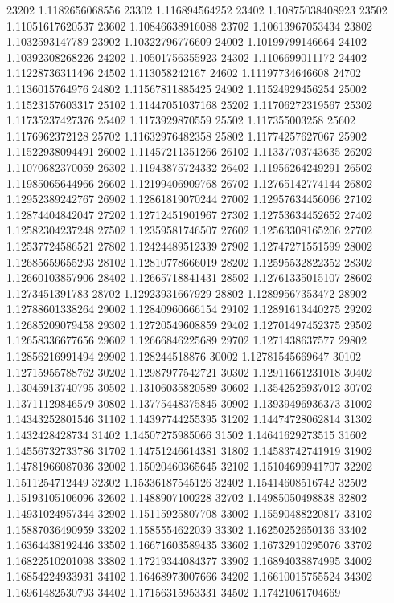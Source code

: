 {23202 1.1182656068556
23302 1.116894564252
23402 1.10875038408923
23502 1.11051617620537
23602 1.10846638916088
23702 1.10613967053434
23802 1.1032593147789
23902 1.10322796776609
24002 1.10199799146664
24102 1.10392308268226
24202 1.10501756355923
24302 1.1106699011172
24402 1.11228736311496
24502 1.113058242167
24602 1.11197734646608
24702 1.1136015764976
24802 1.11567811885425
24902 1.11524929456254
25002 1.11523157603317
25102 1.11447051037168
25202 1.11706272319567
25302 1.11735237427376
25402 1.1173929870559
25502 1.117355003258
25602 1.1176962372128
25702 1.11632976482358
25802 1.11774257627067
25902 1.11522938094491
26002 1.11457211351266
26102 1.11337703743635
26202 1.11070682370059
26302 1.11943875724332
26402 1.11956264249291
26502 1.11985065644966
26602 1.12199406909768
26702 1.12765142774144
26802 1.12952389242767
26902 1.12861819070244
27002 1.12957634456066
27102 1.12874404842047
27202 1.12712451901967
27302 1.12753634452652
27402 1.12582304237248
27502 1.12359581746507
27602 1.12563308165206
27702 1.12537724586521
27802 1.12424489512339
27902 1.12747271551599
28002 1.12685659655293
28102 1.12810778666019
28202 1.12595532822352
28302 1.12660103857906
28402 1.12665718841431
28502 1.12761335015107
28602 1.1273451391783
28702 1.12923931667929
28802 1.12899567353472
28902 1.12788601338264
29002 1.12840960666154
29102 1.12891613440275
29202 1.12685209079458
29302 1.12720549608859
29402 1.12701497452375
29502 1.12658336677656
29602 1.12666846225689
29702 1.1271438637577
29802 1.12856216991494
29902 1.128244518876
30002 1.12781545669647
30102 1.12715955788762
30202 1.12987977542721
30302 1.12911661231018
30402 1.13045913740795
30502 1.13106035820589
30602 1.13542525937012
30702 1.13711129846579
30802 1.13775448375845
30902 1.13939496936373
31002 1.14343252801546
31102 1.14397744255395
31202 1.14474728062814
31302 1.1432428428734
31402 1.14507275985066
31502 1.14641629273515
31602 1.14556732733786
31702 1.14751246614381
31802 1.14583742741919
31902 1.14781966087036
32002 1.15020460365645
32102 1.15104699941707
32202 1.1511254712449
32302 1.15336187545126
32402 1.15414608516742
32502 1.15193105106096
32602 1.1488907100228
32702 1.14985050498838
32802 1.14931024957344
32902 1.15115925807708
33002 1.15590488220817
33102 1.15887036490959
33202 1.1585554622039
33302 1.16250252650136
33402 1.16364438192446
33502 1.16671603589435
33602 1.16732910295076
33702 1.16822510201098
33802 1.17219344084377
33902 1.16894038874995
34002 1.16854224933931
34102 1.16468973007666
34202 1.16610015755524
34302 1.16961482530793
34402 1.17156315953331
34502 1.17421061704669
}
